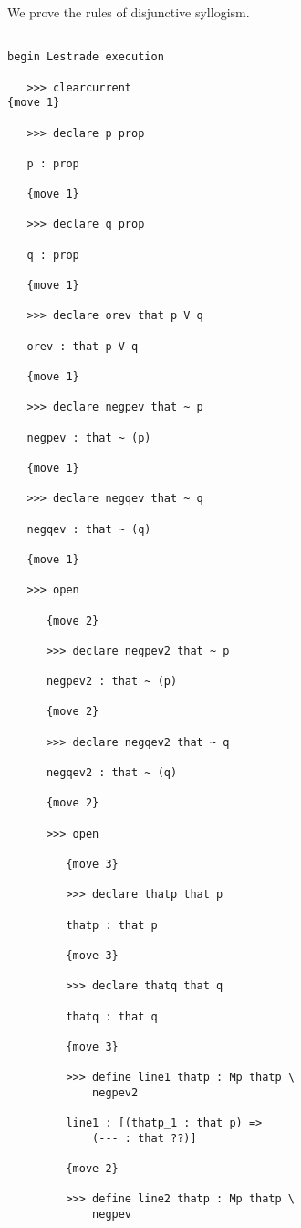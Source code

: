 \documentclass[12pt]{article}
\begin{document}
We prove the rules of disjunctive syllogism.

\begin{verbatim}

begin Lestrade execution

   >>> clearcurrent
{move 1}

   >>> declare p prop

   p : prop

   {move 1}

   >>> declare q prop

   q : prop

   {move 1}

   >>> declare orev that p V q

   orev : that p V q

   {move 1}

   >>> declare negpev that ~ p

   negpev : that ~ (p)

   {move 1}

   >>> declare negqev that ~ q

   negqev : that ~ (q)

   {move 1}

   >>> open

      {move 2}

      >>> declare negpev2 that ~ p

      negpev2 : that ~ (p)

      {move 2}

      >>> declare negqev2 that ~ q

      negqev2 : that ~ (q)

      {move 2}

      >>> open

         {move 3}

         >>> declare thatp that p

         thatp : that p

         {move 3}

         >>> declare thatq that q

         thatq : that q

         {move 3}

         >>> define line1 thatp : Mp thatp \
             negpev2

         line1 : [(thatp_1 : that p) => 
             (--- : that ??)]

         {move 2}

         >>> define line2 thatp : Mp thatp \
             negpev


\end{verbatim}
\end{document}
